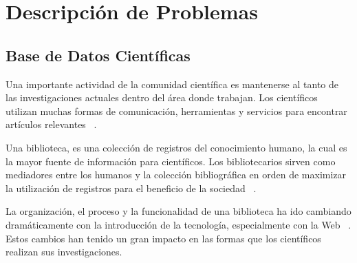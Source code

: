 \documentclass[12pt,oneside,letterpaper]{book}
\newcommand{\eng}[1]{\textit{#1}\xspace}			%
\theoremstyle{definition}
\begin{document}
\chapter{Descripción de Problemas}
\label{chap:problem_description}
\section{Base de Datos Científicas}
\label{sec:base_de_datos_cientificas}

Una importante actividad de la comunidad científica es mantenerse al tanto de las investigaciones actuales dentro
del área donde trabajan. Los científicos utilizan muchas formas de comunicación, herramientas y servicios para encontrar artículos relevantes ~\cite{hoggan2002, tenopir2001}.

Una biblioteca, es una colección de registros del conocimiento humano, la cual es la mayor fuente de información para científicos. Los bibliotecarios sirven como mediadores entre los humanos y la colección bibliográfica en orden de maximizar la utilización de registros para el beneficio de la sociedad ~\cite{marsterson1986}.

La organización, el proceso y la funcionalidad de una biblioteca ha ido cambiando dramáticamente con la introducción de la tecnología, especialmente con la Web ~\cite{saunders1993}. Estos cambios han tenido un gran impacto en las formas que los científicos realizan sus investigaciones.
\end{document}
